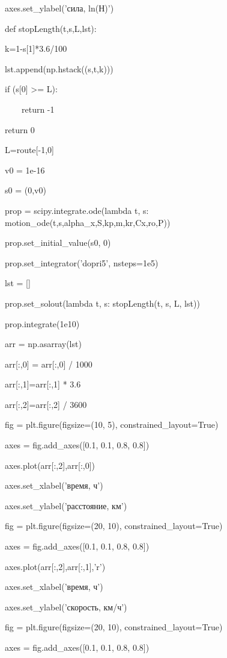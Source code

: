 \documentclass[A4paper,12pt]{article}
\theoremstyle{plain} %
\theoremstyle{definition} %
\theoremstyle{remark} %
\begin{document}
\noindent axes.set\_ylabel('сила, ln(Н)')


\noindent def stopLength(t,s,L,lst):

    k=1-s[1]*3.6/100
    
    lst.append(np.hstack((s,t,k)))
    
    if (s[0] >= L):
    
    \ \ \ \ return -1
        
    return 0 
    
\noindent L=route[-1,0]

\noindent v0 = 1e-16

\noindent s0 = (0,v0)

\noindent prop = scipy.integrate.ode(lambda t, s: motion\_ode(t,s,alpha\_x,S,kp,m,kr,Cx,ro,P))

\noindent prop.set\_initial\_value(s0, 0)

\noindent prop.set\_integrator('dopri5', nsteps=1e5)

\noindent lst = []

\noindent prop.set\_solout(lambda t, s: stopLength(t, s, L, lst))

\noindent prop.integrate(1e10)

\noindent arr = np.asarray(lst)

\noindent arr[:,0] = arr[:,0] / 1000

\noindent arr[:,1]=arr[:,1] * 3.6

\noindent arr[:,2]=arr[:,2] / 3600

\noindent fig = plt.figure(figsize=(10, 5), constrained\_layout=True)

\noindent axes = fig.add\_axes([0.1, 0.1, 0.8, 0.8])

\noindent axes.plot(arr[:,2],arr[:,0])

\noindent axes.set\_xlabel('время, ч')

\noindent axes.set\_ylabel('расстояние, км')

\noindent fig = plt.figure(figsize=(20, 10), constrained\_layout=True)

\noindent axes = fig.add\_axes([0.1, 0.1, 0.8, 0.8])

\noindent axes.plot(arr[:,2],arr[:,1],'r')

\noindent axes.set\_xlabel('время, ч')

\noindent axes.set\_ylabel('скорость, км/ч')

\noindent fig = plt.figure(figsize=(20, 10), constrained\_layout=True)

\noindent axes = fig.add\_axes([0.1, 0.1, 0.8, 0.8])
\end{document}
